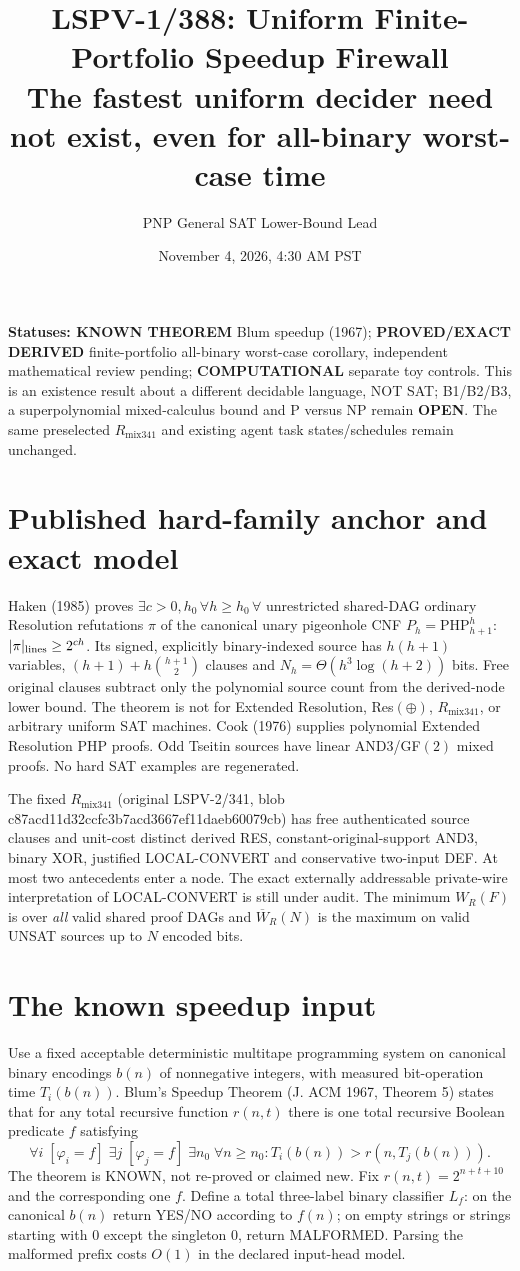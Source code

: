 \documentclass[11pt]{article}
\title{LSPV-1/388: Uniform Finite-Portfolio Speedup Firewall\\The fastest uniform decider need not exist, even for all-binary worst-case time}
\author{PNP General SAT Lower-Bound Lead}
\date{November 4, 2026, 4:30 AM PST}
\begin{document}
\maketitle
\noindent\textbf{Statuses: KNOWN THEOREM} Blum speedup (1967); \textbf{PROVED/EXACT DERIVED} finite-portfolio all-binary worst-case corollary, independent mathematical review pending; \textbf{COMPUTATIONAL} separate toy controls. This is an existence result about a different decidable language, NOT SAT; B1/B2/B3, a superpolynomial mixed-calculus bound and P versus NP remain \textbf{OPEN}. The same preselected $R_{\mathrm{mix341}}$ and existing agent task states/schedules remain unchanged.

\section*{Published hard-family anchor and exact model}
Haken (1985) proves $\exists c>0,h_0\,\forall h\ge h_0\,\forall$ unrestricted shared-DAG ordinary Resolution refutations $\pi$ of the canonical unary pigeonhole CNF $P_h=\mathrm{PHP}_{h+1}^{h}$: $|\pi|_{\rm lines}\ge2^{ch}$. Its signed, explicitly binary-indexed source has $h(h+1)$ variables, $(h+1)+h\binom{h+1}{2}$ clauses and $N_h=\Theta(h^3\log(h+2))$ bits. Free original clauses subtract only the polynomial source count from the derived-node lower bound. The theorem is not for Extended Resolution, Res$(\oplus)$, $R_{\mathrm{mix341}}$, or arbitrary uniform SAT machines. Cook (1976) supplies polynomial Extended Resolution PHP proofs. Odd Tseitin sources have linear AND3/GF$(2)$ mixed proofs. No hard SAT examples are regenerated.

The fixed $R_{\mathrm{mix341}}$ (original LSPV-2/341, blob c87acd11d32ccfc3b7acd3667ef11daeb60079cb) has free authenticated source clauses and unit-cost distinct derived RES, constant-original-support AND3, binary XOR, justified LOCAL-CONVERT and conservative two-input DEF. At most two antecedents enter a node. The exact externally addressable private-wire interpretation of LOCAL-CONVERT is still under audit. The minimum $W_R(F)$ is over \emph{all} valid shared proof DAGs and $\overline W_R(N)$ is the maximum on valid UNSAT sources up to $N$ encoded bits.

\section*{The known speedup input}
Use a fixed acceptable deterministic multitape programming system on canonical binary encodings $b(n)$ of nonnegative integers, with measured bit-operation time $T_i(b(n))$. Blum's Speedup Theorem (J. ACM 1967, Theorem 5) states that for any total recursive function $r(n,t)$ there is one total recursive Boolean predicate $f$ satisfying
\[
\forall i\;[\varphi_i=f]\;\exists j\;[\varphi_j=f]\;\exists n_0\;\forall n\ge n_0:
T_i(b(n))>r(n,T_j(b(n))).
\]
The theorem is KNOWN, not re-proved or claimed new. Fix $r(n,t)=2^{n+t+10}$ and the corresponding one $f$. Define a total three-label binary classifier $L_f$: on the canonical $b(n)$ return YES/NO according to $f(n)$; on empty strings or strings starting with 0 except the singleton $0$, return MALFORMED. Parsing the malformed prefix costs $O(1)$ in the declared input-head model.
\end{document}
